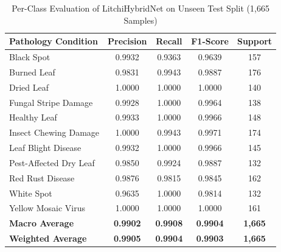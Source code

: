 \begin{table}[t]
\centering
\caption{Per-Class Evaluation of LitchiHybridNet on Unseen Test Split (1,665 Samples)}
\label{tab:perclass}
\begin{tabular}{lcccc}
\toprule
\textbf{Pathology Condition} & \textbf{Precision} & \textbf{Recall} & \textbf{F1-Score} & \textbf{Support} \\
\midrule
Black Spot & 0.9932 & 0.9363 & 0.9639 & 157 \\
Burned Leaf & 0.9831 & 0.9943 & 0.9887 & 176 \\
Dried Leaf & 1.0000 & 1.0000 & 1.0000 & 140 \\
Fungal Stripe Damage & 0.9928 & 1.0000 & 0.9964 & 138 \\
Healthy Leaf & 0.9933 & 1.0000 & 0.9966 & 148 \\
Insect Chewing Damage & 1.0000 & 0.9943 & 0.9971 & 174 \\
Leaf Blight Disease & 0.9932 & 1.0000 & 0.9966 & 145 \\
Pest-Affected Dry Leaf & 0.9850 & 0.9924 & 0.9887 & 132 \\
Red Rust Disease & 0.9876 & 0.9815 & 0.9845 & 162 \\
White Spot & 0.9635 & 1.0000 & 0.9814 & 132 \\
Yellow Mosaic Virus & 1.0000 & 1.0000 & 1.0000 & 161 \\
\midrule
\textbf{Macro Average} & \textbf{0.9902} & \textbf{0.9908} & \textbf{0.9904} & \textbf{1,665} \\
\textbf{Weighted Average} & \textbf{0.9905} & \textbf{0.9904} & \textbf{0.9903} & \textbf{1,665} \\
\bottomrule
\end{tabular}
\end{table}
